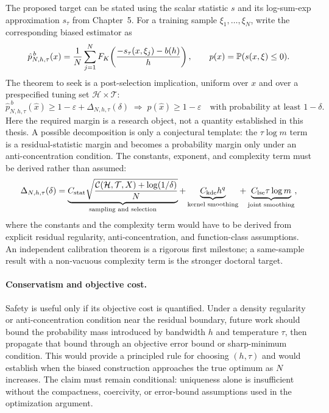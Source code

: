 The proposed target can be stated using the scalar statistic $s$ and its
log-sum-exp approximation $s_\tau$ from Chapter~5. For a training sample
$\xi_1,\ldots,\xi_N$, write the corresponding biased estimator as
\begin{equation}
  \hat p^{\,b}_{N,h,\tau}(x)
  = \frac{1}{N}\sum_{j=1}^{N}
    F_K\!\left(
      \frac{-s_\tau(x,\xi_j)-b(h)}{h}
    \right),
  \qquad
  p(x)=\mathbb{P}(s(x,\xi)\leq 0) .
  \label{eq:future-postselection-estimator}
\end{equation}
The theorem to seek is a post-selection implication, uniform over $x$ and over
a prespecified tuning set $\mathcal H\times\mathcal T$:
\begin{equation}
  \hat p^{\,b}_{N,h,\tau}(\hat x)
  \geq 1-\varepsilon+\Delta_{N,h,\tau}(\delta)
  \;\Longrightarrow\;
  p(\hat x)\geq1-\varepsilon
  \quad\text{with probability at least }1-\delta .
  \label{eq:future-postselection-bound}
\end{equation}
Here the required margin is a research object, not a quantity established in
this thesis. A possible decomposition is only a conjectural template: the
$\tau\log m$ term is a residual-statistic margin and becomes a probability
margin only under an anti-concentration condition. The constants, exponent,
and complexity term must be derived rather than assumed:
\begin{equation}
  \Delta_{N,h,\tau}(\delta)
  = \underbrace{C_{\rm stat}
    \sqrt{\frac{\mathcal C(\mathcal H,\mathcal T,X)+\log(1/\delta)}{N}}}
    _{\text{sampling and selection}}
  + \underbrace{C_{\rm kde}h^{q}}
    _{\text{kernel smoothing}}
  + \underbrace{C_{\rm lse}\tau\log m}
    _{\text{joint smoothing}} ,
  \label{eq:future-margin-decomposition}
\end{equation}
where the constants and the complexity term would have to be derived from
explicit residual regularity, anti-concentration, and function-class assumptions.
An independent calibration theorem is a rigorous first milestone; a same-sample
result with a non-vacuous complexity term is the stronger doctoral target.

\paragraph*{Conservatism and objective cost.}
Safety is useful only if its objective cost is quantified. Under a density
regularity or anti-concentration condition near the residual boundary, future
work should bound the probability mass introduced by bandwidth $h$ and
temperature $\tau$, then propagate that bound through an objective error bound
or sharp-minimum condition. This would provide a principled rule for choosing
$(h,\tau)$ and would establish when the biased construction approaches the true
optimum as $N$ increases. The claim must remain conditional: uniqueness alone is
insufficient without the compactness, coercivity, or error-bound assumptions used
in the optimization argument.

